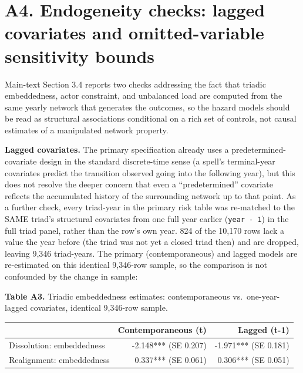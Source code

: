 \documentclass[Afour,sageh,times,doublespace]{sagej}
\begin{document}
\section*{A4. Endogeneity checks: lagged covariates and omitted-variable sensitivity bounds}

Main-text Section 3.4 reports two checks addressing the fact that triadic embeddedness, actor constraint, and unbalanced load are computed from the same yearly network that generates the outcomes, so the hazard models should be read as structural associations conditional on a rich set of controls, not causal estimates of a manipulated network property.

\textbf{Lagged covariates.} The primary specification already uses a predetermined-covariate design in the standard discrete-time sense (a spell's terminal-year covariates predict the transition observed going into the following year), but this does not resolve the deeper concern that even a ``predetermined'' covariate reflects the accumulated history of the surrounding network up to that point. As a further check, every triad-year in the primary risk table was re-matched to the SAME triad's structural covariates from one full year earlier (\texttt{year - 1}) in the full triad panel, rather than the row's own year. 824 of the 10,170 rows lack a value the year before (the triad was not yet a closed triad then) and are dropped, leaving 9,346 triad-years. The primary (contemporaneous) and lagged models are re-estimated on this identical 9,346-row sample, so the comparison is not confounded by the change in sample:

\begin{table}[t]
\centering
\textbf{Table A3.} Triadic embeddedness estimates: contemporaneous vs.\ one-year-lagged covariates, identical 9,346-row sample.

\vspace{4pt}
{\small\sf
\begin{tabular}{lrr}
\toprule
& Contemporaneous (t) & Lagged (t-1)\\
\midrule
Dissolution: embeddedness & -2.148*** (SE 0.207) & -1.971*** (SE 0.181)\\
Realignment: embeddedness & 0.337*** (SE 0.061) & 0.306*** (SE 0.051)\\
\bottomrule
\end{tabular}
\par}
\end{table}
\end{document}
